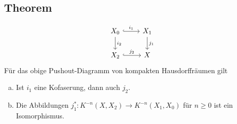 \subsection{Theorem} %
\label{sub:39}
\[
	\begin{tikzcd}
		X_0 \rar[hook,"i_1"] \dar["i_2"]& X_1 \dar["j_1"] \\
		X_2 \rar[hook,"j_2"] & X
	\end{tikzcd}
\]
Für das obige Pushout-Diagramm von kompakten Hausdorffräumen gilt
\begin{enumerate}[a)]
	\item Ist $i_1$ eine Kofaserung, dann auch $j_2$.
	\item Die Abbildungen $j_1^* \colon K^{-n}(X,X_2) \to K^{-n}(X_1,X_0)$ für $n \ge 0$ ist ein Isomorphismus.
\end{enumerate}
